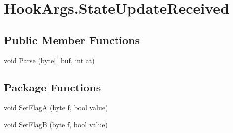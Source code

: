 \hypertarget{structOTA_1_1Plugin_1_1HookArgs_1_1StateUpdateReceived}{}\section{Hook\+Args.\+State\+Update\+Received}
\label{structOTA_1_1Plugin_1_1HookArgs_1_1StateUpdateReceived}
\subsection*{Public Member Functions}
\begin{DoxyCompactItemize}
\item 
void \hyperlink{structOTA_1_1Plugin_1_1HookArgs_1_1StateUpdateReceived_a854f31fd53049e109c2313dc47c54cca}{Parse} (byte\mbox{[}$\,$\mbox{]} buf, int at)
\end{DoxyCompactItemize}
\subsection*{Package Functions}
\begin{DoxyCompactItemize}
\item 
void \hyperlink{structOTA_1_1Plugin_1_1HookArgs_1_1StateUpdateReceived_a44ac52fb25c27c8404bad51bf0e84e98}{Set\+Flag\+A} (byte f, bool value)
\item 
void \hyperlink{structOTA_1_1Plugin_1_1HookArgs_1_1StateUpdateReceived_ac22d438e8f2b6783c8e89d229e767284}{Set\+Flag\+B} (byte f, bool value)
\end{DoxyCompactItemize}
